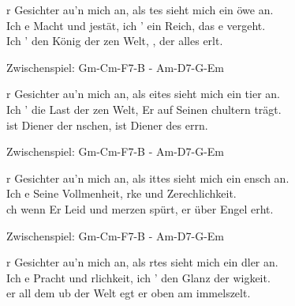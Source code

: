 
r Gesichter au'n mich an, als tes sieht mich ein öwe an.\\
Ich e Macht und jestät, ich ' ein Reich, das e vergeht.\\
Ich ' den König der zen Welt, , der alles erlt.\\ 

\begin{footnotesize}Zwischenspiel: Gm-Cm-F7-B - Am-D7-G-Em\\ \end{footnotesize}

r Gesichter au'n mich an, als eites sieht mich ein tier an.\\
Ich ' die Last der zen Welt,  Er auf Seinen chultern trägt.\\
 ist Diener der nschen,  ist Diener des errn.\\

\begin{footnotesize}Zwischenspiel: Gm-Cm-F7-B - Am-D7-G-Em\\ \end{footnotesize}

r Gesichter au'n mich an, als ittes sieht mich ein ensch an.\\
Ich e Seine Vollmenheit, rke und Zerechlichkeit.\\
ch wenn Er Leid und merzen spürt,  er über Engel erht.\\      

\begin{footnotesize}Zwischenspiel: Gm-Cm-F7-B - Am-D7-G-Em\\ \end{footnotesize}

r Gesichter au'n mich an, als rtes sieht mich ein dler an.\\
Ich e Pracht und rlichkeit, ich ' den Glanz der wigkeit.\\
er all dem ub der Welt egt er oben am immelszelt.\\

